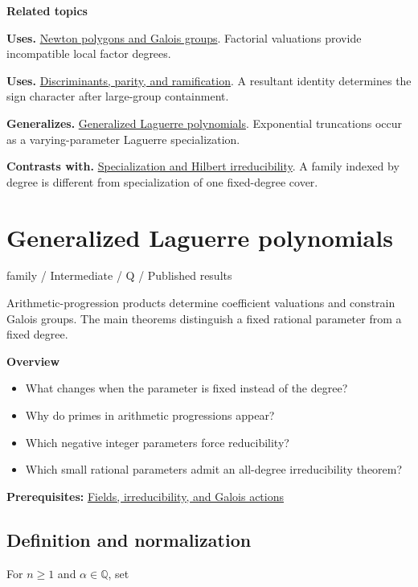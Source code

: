 \documentclass[11pt,a4paper,oneside,openany]{book}
\begin{document}
\par\medskip\begingroup\footnotesize\setlength{\parskip}{1pt}\textbf{\sffamily\color{atlasgreen}Related topics}\par
\color{black}\textbf{Uses.} \hyperlink{article:newton-polygons}{Newton polygons and Galois groups}. Factorial valuations provide incompatible local factor degrees.\par
\color{black}\textbf{Uses.} \hyperlink{article:discriminants}{Discriminants, parity, and ramification}. A resultant identity determines the sign character after large-group containment.\par
\color{black}\textbf{Generalizes.} \hyperlink{article:laguerre}{Generalized Laguerre polynomials}. Exponential truncations occur as a varying-parameter Laguerre specialization.\par
\color{black}\textbf{Contrasts with.} \hyperlink{article:specialization}{Specialization and Hilbert irreducibility}. A family indexed by degree is different from specialization of one fixed-degree cover.\par
\endgroup
\chapter{Generalized Laguerre polynomials}\label{article:laguerre}\hypertarget{article:laguerre}{}\color{black}
{\sffamily\small\color{atlasgold}family / Intermediate / Q / Published results}\par\medskip
Arithmetic-progression products determine coefficient valuations and constrain Galois groups. The main theorems distinguish a fixed rational parameter from a fixed degree.\par\medskip
\textbf{Overview}\begin{itemize}
\item What changes when the parameter is fixed instead of the degree?
\item Why do primes in arithmetic progressions appear?
\item Which negative integer parameters force reducibility?
\item Which small rational parameters admit an all-degree irreducibility theorem?
\end{itemize}
{\small\textbf{Prerequisites:} \hyperlink{article:foundations}{Fields, irreducibility, and Galois actions}}\par
{}\section{Definition and normalization}
\color{black} For \(n\ge1\) and \(\alpha\in\mathbb Q\), set\par
\end{document}
